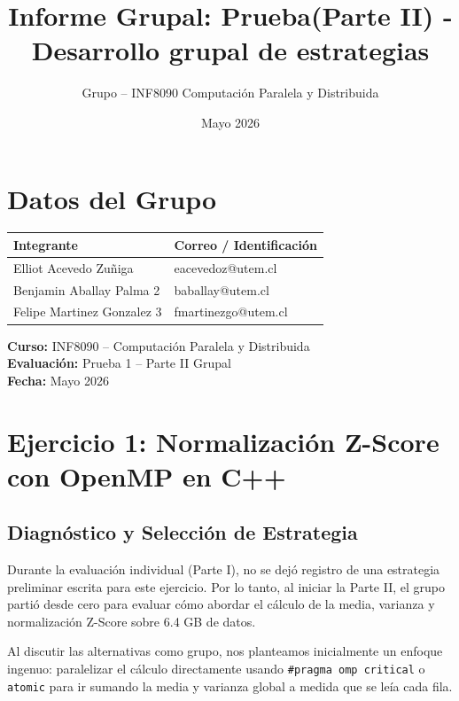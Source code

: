 \documentclass[10pt,a4paper]{article}
\title{\textbf{Informe Grupal: Prueba(Parte II) - Desarrollo grupal de estrategias}}
\author{Grupo -- INF8090 Computaci\'on Paralela y Distribuida}
\date{Mayo 2026}
\begin{document}
\maketitle

\section*{Datos del Grupo}
\begin{table}[H]
\centering
\begin{tabular}{p{6cm}p{7cm}}
\toprule
\textbf{Integrante} & \textbf{Correo / Identificaci\'on} \\
\midrule
Elliot Acevedo Zuñiga & eacevedoz@utem.cl\\
Benjamin Aballay Palma 2 & baballay@utem.cl\\ 
Felipe Martinez Gonzalez 3 & fmartinezgo@utem.cl\\
\bottomrule
\end{tabular}
\end{table}
\vspace{0.5cm}
\noindent\textbf{Curso:} INF8090 -- Computaci\'on Paralela y Distribuida\\
\textbf{Evaluaci\'on:} Prueba 1 -- Parte II Grupal\\
\textbf{Fecha:} Mayo 2026
\newpage

\section{Ejercicio 1: Normalizaci\'on Z-Score con OpenMP en C++}

\subsection{Diagn\'ostico y Selecci\'on de Estrategia}

Durante la evaluaci\'on individual (Parte I), no se dej\'o registro de una
estrategia preliminar escrita para este ejercicio. Por lo tanto, al iniciar la
Parte II, el grupo parti\'o desde cero para evaluar c\'omo abordar el c\'alculo
de la media, varianza y normalizaci\'on Z-Score sobre 6.4 GB de datos.

Al discutir las alternativas como grupo, nos planteamos inicialmente un enfoque
ingenuo: paralelizar el c\'alculo directamente usando \texttt{\#pragma omp critical}
o \texttt{atomic} para ir sumando la media y varianza global a medida que se
le\'ia cada fila.
\end{document}
